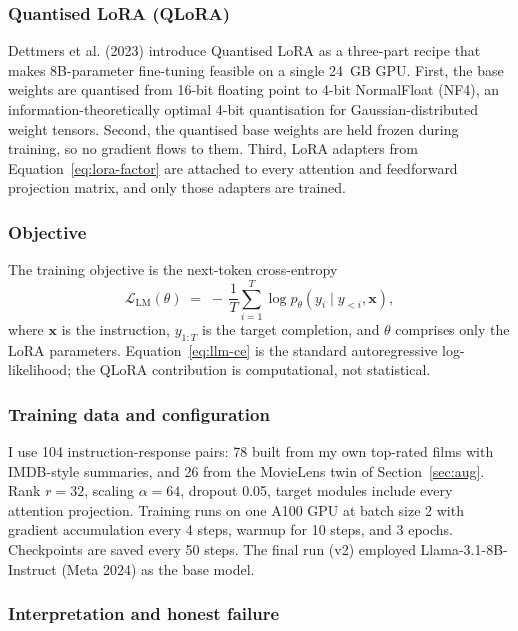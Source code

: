 \documentclass{article}
\begin{document}
\subsubsection*{Quantised LoRA (QLoRA)}

Dettmers et al. (2023) introduce Quantised LoRA as a three-part recipe that makes 8B-parameter fine-tuning feasible on a single 24~GB GPU. First, the base weights are quantised from 16-bit floating point to 4-bit NormalFloat (NF4), an information-theoretically optimal 4-bit quantisation for Gaussian-distributed weight tensors. Second, the quantised base weights are held frozen during training, so no gradient flows to them. Third, LoRA adapters from Equation~\ref{eq:lora-factor} are attached to every attention and feedforward projection matrix, and only those adapters are trained.

\subsubsection*{Objective}

The training objective is the next-token cross-entropy
\begin{equation}
\mathcal{L}_\text{LM}(\theta) \;=\; -\, \frac{1}{T}\sum_{i=1}^{T} \log p_\theta(y_i \mid y_{<i}, \mathbf{x}),
\label{eq:llm-ce}
\end{equation}
where $\mathbf{x}$ is the instruction, $y_{1:T}$ is the target completion, and $\theta$ comprises only the LoRA parameters. Equation~\ref{eq:llm-ce} is the standard autoregressive log-likelihood; the QLoRA contribution is computational, not statistical.

\subsubsection*{Training data and configuration}

I use 104 instruction-response pairs: 78 built from my own top-rated films with IMDB-style summaries, and 26 from the MovieLens twin of Section~\ref{sec:aug}. Rank $r = 32$, scaling $\alpha = 64$, dropout 0.05, target modules include every attention projection. Training runs on one A100 GPU at batch size 2 with gradient accumulation every 4 steps, warmup for 10 steps, and 3 epochs. Checkpoints are saved every 50 steps. The final run (v2) employed Llama-3.1-8B-Instruct (Meta 2024) as the base model.

\subsubsection*{Interpretation and honest failure}
\end{document}
